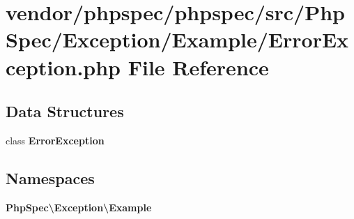 \section{vendor/phpspec/phpspec/src/\+Php\+Spec/\+Exception/\+Example/\+Error\+Exception.php File Reference}
\label{phpspec_2phpspec_2src_2_php_spec_2_exception_2_example_2_error_exception_8php}
\subsection*{Data Structures}
\begin{DoxyCompactItemize}
\item 
class {\bf Error\+Exception}
\end{DoxyCompactItemize}
\subsection*{Namespaces}
\begin{DoxyCompactItemize}
\item 
 {\bf Php\+Spec\textbackslash{}\+Exception\textbackslash{}\+Example}
\end{DoxyCompactItemize}
